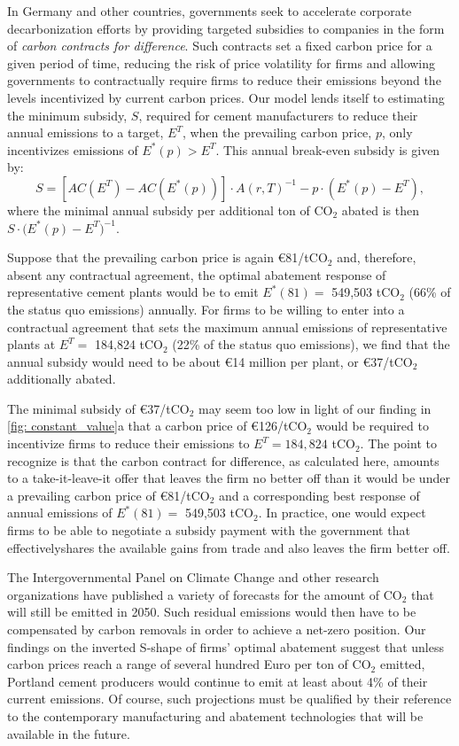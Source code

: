 \documentclass[12pt, a4paper]{article} %
\begin{document}
In Germany and other countries, governments seek to accelerate corporate decarbonization efforts by providing targeted subsidies to companies in the form of \emph{carbon contracts for difference}. Such contracts set a fixed carbon price for a given period of time, reducing the risk of price volatility for firms and allowing governments to contractually require firms to reduce their emissions beyond the levels incentivized by current carbon prices. Our model lends itself to estimating the minimum subsidy, $S$, required for cement manufacturers to reduce their annual emissions to a target, $E^T$, when the prevailing carbon price, $p$, only incentivizes emissions of $E^*(p) > E^T$. This annual break-even subsidy is given by:
\begin{equation}
S = [AC(E^T) - AC(E^*(p))] \cdot A(r,T)^{-1} - p \cdot (E^*(p) - E^T),
\end{equation}
where the minimal annual subsidy per additional ton of CO$_2$ abated is then $S \cdot \bigl(E^*(p) - E^T\bigr)^{-1}$.

Suppose that the prevailing carbon price is again \euro 81/tCO$_2$ and, therefore, absent any contractual agreement, the optimal abatement response of representative cement plants would be to emit $E^*(81)=$ 549,503 tCO$_2$ (66\% of the status quo emissions) annually. For firms to be willing to enter into a contractual agreement that sets the maximum annual emissions of representative plants at $E^T =$ 184,824 tCO$_2$ (22\% of the status quo emissions), we find that the annual subsidy would need to be about \euro 14 million per plant, or \euro 37/tCO$_2$ additionally abated.

The minimal subsidy of \euro 37/tCO$_2$ may seem too low in light of our finding in \autoref{fig: constant_value}a that a carbon price of \euro 126/tCO$_2$ would be required to incentivize firms to reduce their emissions to $E^T = 184,824$ tCO$_2$. The point to recognize is that the carbon contract for difference, as calculated here, amounts to a take-it-leave-it offer that leaves the firm no better off than it would be under a prevailing carbon price of \euro 81/tCO$_2$ and a corresponding best response of annual emissions of $E^*(81)=$ 549,503 tCO$_2$. In practice, one would expect firms to be able to negotiate a subsidy payment with the government that effectivelyshares the available gains from trade and also leaves the firm better off.

The Intergovernmental Panel on Climate Change and other research organizations have published a variety of forecasts for the amount of CO$_2$ that will still be emitted in 2050. Such residual emissions would then have to be compensated by carbon removals in order to achieve a net-zero position. Our findings on the inverted S-shape of firms' optimal abatement suggest that unless carbon prices reach a range of several hundred Euro per ton of CO$_2$ emitted, Portland cement producers would continue to emit at least about 4\% of their current emissions. Of course, such projections must be qualified by their reference to the contemporary manufacturing and abatement technologies that will be available in the future.
\end{document}
